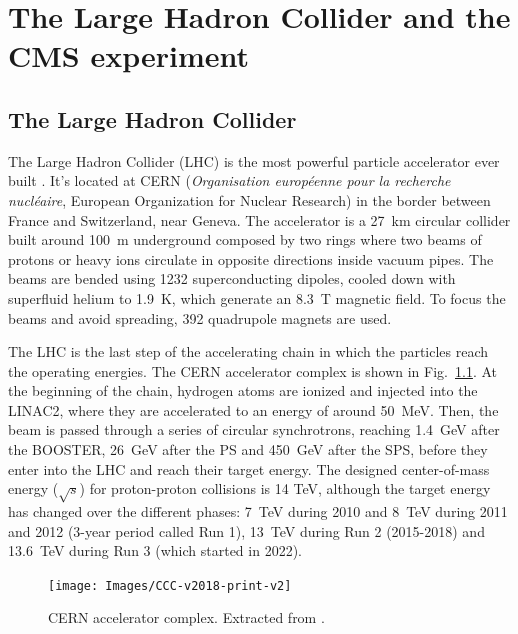 \documentclass[../main.tex]{subfiles}
\begin{document}
\chapter{The Large Hadron Collider and the CMS experiment}
\label{intro:chap:exp}

\section{The Large Hadron Collider}
\label{intro:sec:lhc}

The Large Hadron Collider (LHC) is the most powerful particle accelerator ever built \cite{intro:exp:lhc}. It's located at CERN (\textit{Organisation européenne pour la recherche nucléaire}, European Organization for Nuclear Research) in the border between France and Switzerland, near Geneva. The accelerator is a 27~km circular collider built around 100~m underground composed by two rings where two beams of protons or heavy ions circulate in opposite directions inside vacuum pipes. The beams are bended using 1232 superconducting dipoles, cooled down with superfluid helium to 1.9~K, which generate an 8.3~T magnetic field. To focus the beams and avoid spreading, 392 quadrupole magnets are used.

The LHC is the last step of the accelerating chain in which the particles reach the operating energies. The CERN accelerator complex is shown in Fig.~\ref{intro:exp:cern_acc_chain}. At the beginning of the chain, hydrogen atoms are ionized and injected into the LINAC2, where they are accelerated to an energy of around 50~MeV. Then, the beam is passed through a series of circular synchrotrons, reaching 1.4~GeV after the BOOSTER, 26~GeV after the PS and 450~GeV after the SPS, before they enter into the LHC and reach their target energy. The designed center-of-mass energy ($\sqrt{s}$) for proton-proton collisions is 14 TeV, although the target energy has changed over the different phases: 7~TeV during 2010 and 8~TeV during 2011 and 2012 (3-year period called Run 1), 13~TeV during Run 2 (2015-2018) and 13.6~TeV during Run 3 (which started in 2022).

\begin{figure}[h!]
\begin{center}
\texttt{[image: Images/CCC-v2018-print-v2]}
\end{center}
\caption[CERN accelerator complex]{CERN accelerator complex. Extracted from \cite{intro:exp:cern_acc_chain_image}.}
\label{intro:exp:cern_acc_chain}
\end{figure}
\end{document}

